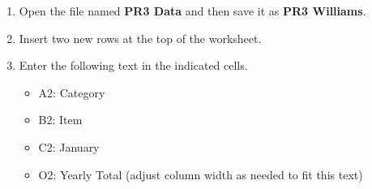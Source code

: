 \begin{enumerate}
	\item Open the file named \textbf{PR3 Data} and then save it as \textbf{PR3 Williams}.
	\item Insert two new rows at the top of the worksheet.
	\item Enter the following text in the indicated cells.

\begin{itemize}
	\item \textsf{A2}: Category
	\item \textsf{B2}: Item
	\item \textsf{C2}: January
	\item \textsf{O2}: Yearly Total (adjust column width as needed to fit this text)
\end{itemize}


\end{enumerate}
